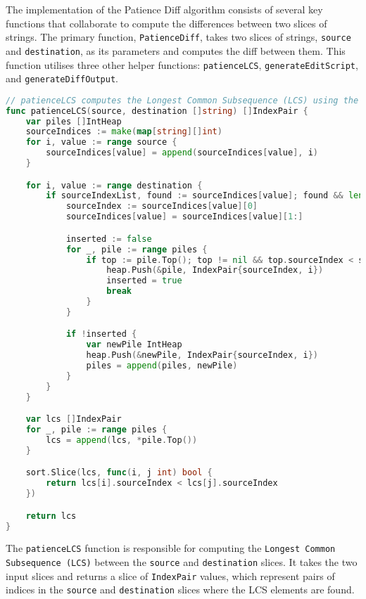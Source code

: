 The implementation of the Patience Diff algorithm consists of several key functions that collaborate to compute the differences between two slices of strings. The primary function, \lstinline{PatienceDiff}, takes two slices of strings, \lstinline{source} and \lstinline{destination}, as its parameters and computes the diff between them. This function utilises three other helper functions: \lstinline{patienceLCS}, \lstinline{generateEditScript}, and \lstinline{generateDiffOutput}.

\begin{lstlisting}[language=go]
// patienceLCS computes the Longest Common Subsequence (LCS) using the patience sorting algorithm
func patienceLCS(source, destination []string) []IndexPair {
	var piles []IntHeap
	sourceIndices := make(map[string][]int)
	for i, value := range source {
		sourceIndices[value] = append(sourceIndices[value], i)
	}

	for i, value := range destination {
		if sourceIndexList, found := sourceIndices[value]; found && len(sourceIndexList) > 0 {
			sourceIndex := sourceIndices[value][0]
			sourceIndices[value] = sourceIndices[value][1:]

			inserted := false
			for _, pile := range piles {
				if top := pile.Top(); top != nil && top.sourceIndex < sourceIndex {
					heap.Push(&pile, IndexPair{sourceIndex, i})
					inserted = true
					break
				}
			}

			if !inserted {
				var newPile IntHeap
				heap.Push(&newPile, IndexPair{sourceIndex, i})
				piles = append(piles, newPile)
			}
		}
	}

	var lcs []IndexPair
	for _, pile := range piles {
		lcs = append(lcs, *pile.Top())
	}

	sort.Slice(lcs, func(i, j int) bool {
		return lcs[i].sourceIndex < lcs[j].sourceIndex
	})

	return lcs
}
\end{lstlisting}
\medskip

The \lstinline{patienceLCS} function is responsible for computing the \lstinline{Longest Common Subsequence (LCS)} between the \lstinline{source} and \lstinline{destination} slices. It takes the two input slices and returns a slice of \lstinline{IndexPair} values, which represent pairs of indices in the \lstinline{source} and \lstinline{destination} slices where the LCS elements are found.

